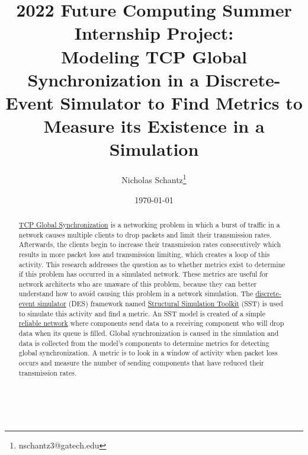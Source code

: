 \documentclass{article}
\begin{document}
        \title{2022 Future Computing Summer Internship Project:\\Modeling TCP Global Synchronization in a Discrete-Event Simulator to Find Metrics to Measure its Existence in a Simulation}
        \author{Nicholas Schantz\thanks{nschantz3@gatech.edu}}
        \date{\today}
            \maketitle
        \begin{abstract}
            \href{https://en.wikipedia.org/wiki/TCP_global_synchronization}{TCP Global Synchronization} is a networking problem in which a burst of traffic in a network causes multiple clients to drop packets and limit their transmission rates. Afterwards, the clients begin to increase their transmission rates consecutively which results in more packet loss and transmission limiting, which creates a loop of this activity. This research addresses the question as to whether metrics exist to determine if this problem has occurred in a simulated network. These metrics are useful for network architects who are unaware of this problem, because they can better understand how to avoid causing this problem in a network simulation. The \href{https://en.wikipedia.org/wiki/Discrete-event_simulation}{discrete-event simulator} (DES) framework named \href{http://sst-simulator.org/}{Structural Simulation Toolkit} (SST) is used to simulate this activity and find a metric. An SST model is created of a simple \href{https://en.wikipedia.org/wiki/Reliability_(computer_networking}{reliable network} where components send data to a receiving component who will drop data when its queue is filled. Global synchronization is caused in the simulation and data is collected from the model's components to determine metrics for detecting global synchronization. A metric is to look in a window of activity when packet loss occurs and measure the number of sending components that have reduced their transmission rates.

        \end{abstract}

\ \\


\end{document}
